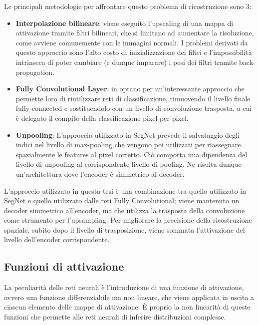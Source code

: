 \documentclass[12pt,a4paper]{report}
\begin{document}
Le principali metodologie per affrontare questo problema di ricostruzione sono 3:
\begin{itemize}
    \item \textbf{Interpolazione bilineare}: viene eseguito l'upscaling di una 
        mappa di attivazione tramite filtri bilineari, che si limitano ad 
        aumentare la risoluzione, come avviene comunemente con le immagini 
        normali. I problemi derivati da questo approccio sono l'alto costo di
        inizializzazione dei filtri e l'impossibilità intrinseca di poter 
        cambiare (e dunque imparare) i pesi dei filtri tramite back-propagation.

    \item \textbf{Fully Convolutional Layer}:
        \citeauthor{DBLP:journals/corr/NohHH15} in 
        \cite{DBLP:journals/corr/NohHH15} optano per un'interessante approccio
        che permette loro di riutilizzare reti di classificazione, rimuovendo il
        livello finale fully-connected e sostituendolo con un livello di
        convoluzione trasposta, a cui è delegato il compito della
        classificazione pixel-per-pixel. 

    \item \textbf{Unpooling}: L'approccio utilizzato in SegNet prevede il 
        salvataggio degli indici nel livello di max-pooling che vengono
        poi utilizzati per riassegnare spazialmente le features al pixel 
        corretto. Ciò comporta una dipendenza del livello di unpooling al 
        corrispondente livello di pooling. Ne risulta dunque un'architettura
        dove l'encoder è simmetrico al decoder.
\end{itemize}

L'approccio utilizzato in questa tesi è una combinazione tra quello utilizzato
in SegNet e quello utilizzato dalle reti Fully Convolutional; viene mantenuto
un decoder simmetrico all'encoder, ma che utilizza la trasposta della
convoluzione come strumento per l'upsampling. Per migliorare la precisione della
ricostruzione spaziale, subito dopo il livello di trasposizione, viene sommata
l'attivazione del livello dell'encoder corrispondente.

\subsection{Funzioni di attivazione}
La peculiarità delle reti neurali è l'introduzione di una funzione di
attivazione, ovvero una funzione differenziabile ma non lineare, che viene
applicata in uscita a ciascun elemento delle mappe di attivazione. \`E proprio
la non linearità di queste funzioni che permette alle reti neurali di inferire
distribuzioni complesse.
\end{document}
